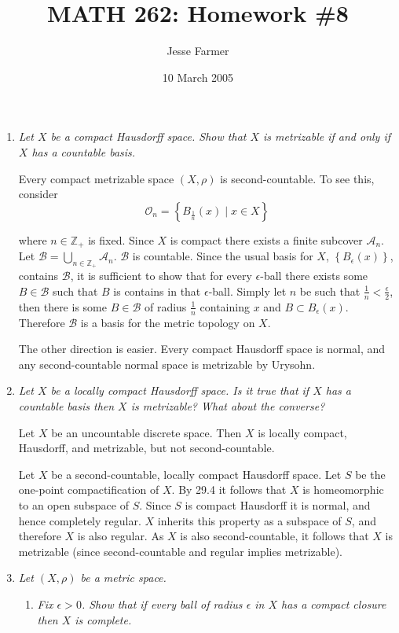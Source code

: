 \documentclass[10pt]{article}
\title{MATH 262: Homework \#8}
\author{Jesse Farmer}
\date{10 March 2005}
\newcommand{\Z}{\mathbb{Z}}
\begin{document}
\maketitle
\begin{enumerate}

\item \emph{Let $X$ be a compact Hausdorff space.  Show that $X$ is metrizable if and only if $X$ has a countable basis.}


Every compact metrizable space $(X, \rho)$ is second-countable.  To see this, consider $$\mathcal{O}_n = \left\{B_\frac{1}{n}(x) \mid x \in X\right\}$$

where $n \in \Z_+$ is fixed.  Since $X$ is compact there exists a finite subcover $\mathcal{A}_n$.  Let $\mathcal{B} = \bigcup_{n \in \Z_+} \mathcal{A}_n$.  $\mathcal{B}$ is countable.  Since the usual basis for $X$, $\left\{B_\epsilon(x)\right\}$, contains $\mathcal{B}$, it is sufficient to show that for every $\epsilon$-ball there exists some $B \in \mathcal{B}$ such that $B$ is contains in that $\epsilon$-ball.  Simply let $n$ be such that $\frac{1}{n} < \frac{\epsilon}{2}$, then there is some $B \in \mathcal{B}$ of radius $\frac{1}{n}$ containing $x$ and $B \subset B_\epsilon(x)$.  Therefore $\mathcal{B}$ is a basis for the metric topology on $X$.

The other direction is easier.  Every compact Hausdorff space is normal, and any second-countable normal space is metrizable by Urysohn.

\item \emph{Let $X$ be a locally compact Hausdorff space.  Is it true that if $X$ has a countable basis then $X$ is metrizable?  What about the converse?}

Let $X$ be an uncountable discrete space.  Then $X$ is locally compact, Hausdorff, and metrizable, but not second-countable.

Let $X$ be a second-countable, locally compact Hausdorff space.  Let $S$ be the one-point compactification of $X$.  By 29.4 it follows that $X$ is homeomorphic to an open subspace of $S$.  Since $S$ is compact Hausdorff it is normal, and hence completely regular.  $X$ inherits this property as a subspace of $S$, and therefore $X$ is also regular.  As $X$ is also second-countable, it follows that $X$ is metrizable (since second-countable and regular implies metrizable).

\item \emph{Let $(X, \rho)$ be a metric space.}
\begin{enumerate}
\item \emph{Fix $\epsilon > 0$.  Show that if every ball of radius $\epsilon$ in $X$ has a compact closure then $X$ is complete.}


\end{enumerate}
\end{enumerate}
\end{document}
